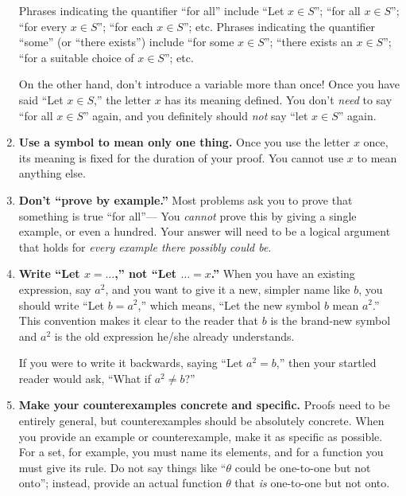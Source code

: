 \documentclass[11pt]{article}
\begin{document}
\begin{enumerate}
        Phrases indicating the quantifier ``for all'' include 
           ``Let $x\in S$'';
           ``for all $x\in S$'';
           ``for every $x\in S$'';
           ``for each $x\in S$''; etc.
        Phrases indicating the quantifier ``some'' (or ``there exists'') include
           ``for some $x\in S$'';
           ``there exists an $x\in S$'';
           ``for a suitable choice of $x\in S$''; etc.
        
        On the other hand, don't introduce a variable more than once!
        Once you have said ``Let $x\in S$,''
        the letter $x$ has its meaning defined.
        You don't \emph{need} to say ``for all $x\in S$'' again,
        and you definitely should \emph{not} say ``let $x\in S$'' again.

\item \textbf{Use a symbol to mean only one thing.}
        Once you use the letter $x$ once,
        its meaning is fixed for the duration of your proof.
        You cannot use $x$ to mean anything else.

\item \textbf{Don't ``prove by example.''}\label{pfbyexample}
        Most problems ask you to prove that something is true ``for all''---%
        You \emph{cannot} prove this by giving a single example, or even a hundred.
        Your answer will need to be a logical argument that holds for \emph{every example there possibly could be}.
        
\item \textbf{Write ``Let $x=\dots$,'' not ``Let $\dots=x$.''} 
        When you have an existing expression, say $a^{2}$,
        and you want to give it a new, simpler name like $b$,
        you should write ``Let $b=a^{2}$,''
        which means, ``Let the new symbol $b$ mean $a^{2}$.''
        This convention makes it clear to the reader that $b$ is the brand-new symbol
        and $a^{2}$ is the old expression he/she already understands.
        
        If you were to write it backwards, saying ``Let $a^{2}=b$,''
        then your startled reader would ask,
        ``What if $a^{2}\neq b$?''
  
\item \textbf{Make your counterexamples concrete and specific.}
        Proofs need to be entirely general,
        but counterexamples should be absolutely concrete.
        When you provide an example or counterexample,
        make it as specific as possible.
        For a set, for example, you must name its elements,
        and for a function you must give its rule.
        Do not say things like ``$\theta$ could be one-to-one but not onto'';
        instead, provide an actual function $\theta$ that \emph{is} one-to-one but not onto.
    

\end{enumerate}
\end{document}
